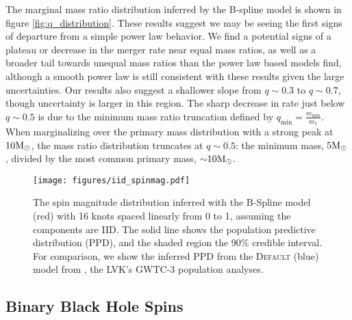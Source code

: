 The marginal mass ratio distribution inferred by the B-spline model is shown in figure \ref{fig:q_distribution}.  These results suggest we may be seeing the first signs of departure from a simple power law behavior.  We find a potential signs of a plateau or decrease in the merger rate near equal mass ratios, as well as a broader tail towards unequal mass ratios 
than the power law based models find, although a smooth power law is still consistent with these results given the large uncertainties. Our results also suggest a shallower slope from $q\sim0.3$ to $q\sim0.7$, though uncertainty is larger in this region. The sharp decrease in rate just below 
$q\sim0.5$ is due to the minimum mass ratio truncation defined by $q_\mathrm{min}=\frac{m_\mathrm{min}}{m_1}$. When marginalizing over the primary mass 
distribution with a strong peak at $10{\rm M}_\odot$, the mass ratio distribution truncates at $q\sim0.5$: the minimum mass, $5{\rm M}_\odot$, 
divided by the most common primary mass, ${\sim}10{\rm M}_\odot$. 

\begin{figure}[ht!]
    \begin{centering}    
        \texttt{[image: figures/iid\_spinmag.pdf]}
        \caption{The spin magnitude distribution inferred with the B-Spline model (red) with 16 knots spaced linearly from 0 to 1, assuming the components are IID. The solid line shows the population predictive distribution (PPD), and the shaded region the 90\% credible interval. 
        For comparison, we show the inferred PPD from the \textsc{Default} (blue) model from \citet{o3b_astro_dist}, the LVK's GWTC-3 population analyses.}
        \label{fig:iid_spinmag_dist}
    \end{centering}
\end{figure}

\subsection{Binary Black Hole Spins} \label{sec:spin_dist}

